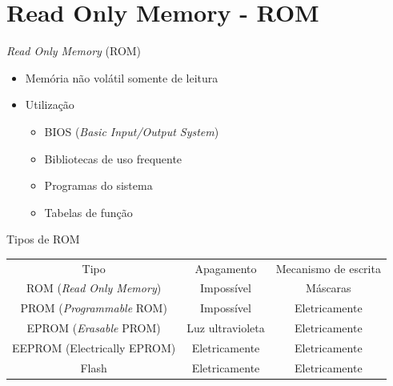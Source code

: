\documentclass[aspectratio=169,
				xcolor=table]{beamer}
\begin{document}
	\section{Read Only Memory - ROM}
	\begin{frame}{\textit{Read Only Memory} (ROM)}
		\begin{itemize}
			\item Memória não volátil somente de leitura
			\vspace{1em}
			\item Utilização
			\begin{itemize}
				\item BIOS (\textit{Basic Input/Output System})
				\item Bibliotecas de uso frequente
				\item Programas do sistema
				\item Tabelas de função
			\end{itemize}
		\end{itemize}
	\end{frame}	
	
	\begin{frame}{Tipos de ROM}		
		\begin{eftable}
			\centering
			\begin{tabular}{c|c|c}
				{\color[HTML]{FFFFFF} Tipo}                                             & {\color[HTML]{FFFFFF} Apagamento} & {\color[HTML]{FFFFFF} Mecanismo de escrita} \\
				ROM (\textit{Read Only Memory}) & Impossível & Máscaras \\
				PROM (\textit{Programmable} ROM)  & Impossível & Eletricamente \\
				EPROM (\textit{Erasable} PROM)       & Luz ultravioleta & Eletricamente \\
				EEPROM (Electrically   EPROM) & Eletricamente & Eletricamente\\
				Flash & Eletricamente & Eletricamente
			\end{tabular}
		\end{eftable}		
	\end{frame}
		
\end{document}
